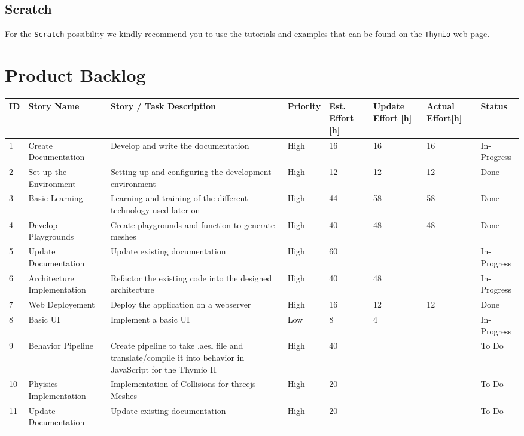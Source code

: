 \documentclass{scrbook}
\begin{document}
\section{Scratch}

For the \texttt{Scratch} possibility we kindly recommend you to use the tutorials and examples that can be found on the \href{https://www.thymio.org/program/scratch/}{\texttt{Thymio} web page}.

\chapter{Product Backlog}
\begin{longtable}{p{5mm}|p{2cm}|p{4cm}|p{1cm}|p{1cm}|p{1cm}|p{1cm}|p{15mm}}
  ID                     & Story Name & Story / Task Description & Priority & Est. Effort {[}h{]} & Update Effort {[}h{]} & Actual Effort{[}h{]} & Status                \\ \hline
  1 & Create Documentation & Develop and write the documentation & High & 16 & 16 & 16 & In-Progress \\ 
  2 & Set up the Environment & Setting up and configuring the development environment & High & 12 & 12 & 12 & Done \\ 
  3 & Basic Learning & Learning and training of the different technology used later on & High & 44 & 58 & 58 & Done \\ 
  4 & Develop Playgrounds & Create playgrounds and function to generate meshes & High & 40 & 48 & 48 & Done \\ 
  5 & Update Documentation & Update existing documentation & High & 60 &  &  & In-Progress \\
  6 & Architecture Implementation & Refactor the existing code into the designed architecture & High & 40 & 48 &  & In-Progress\\ 
  7 & Web Deployement & Deploy the application on a webserver & High & 16 & 12 & 12 & Done \\ 
  8 & Basic UI & Implement a basic UI & Low & 8 & 4 &  & In-Progress \\ 
  9 & Behavior Pipeline & Create pipeline to take .aesl file and translate/compile it into behavior in JavaScript for the Thymio II & High & 40 &  &  & To Do \\ 
  10 & Phyisics Implementation & Implementation of Collisions for threejs Meshes & High & 20 &  &  & To Do \\ 
  11 & Update Documentation & Update existing documentation & High & 20 &  &  & To Do \\ 

\end{longtable}
\end{document}

